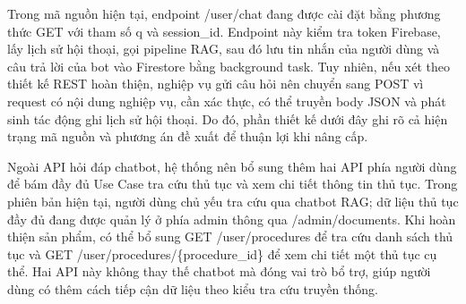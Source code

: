 Trong mã nguồn hiện tại, endpoint /user/chat đang được cài đặt bằng
phương thức GET với tham số q và session\_id. Endpoint này kiểm tra
token Firebase, lấy lịch sử hội thoại, gọi pipeline RAG, sau đó lưu tin
nhắn của người dùng và câu trả lời của bot vào Firestore bằng background
task. Tuy nhiên, nếu xét theo thiết kế REST hoàn thiện, nghiệp vụ gửi
câu hỏi nên chuyển sang POST vì request có nội dung nghiệp vụ, cần xác
thực, có thể truyền body JSON và phát sinh tác động ghi lịch sử hội
thoại. Do đó, phần thiết kế dưới đây ghi rõ cả hiện trạng mã nguồn và
phương án đề xuất để thuận lợi khi nâng cấp.

Ngoài API hỏi đáp chatbot, hệ thống nên bổ sung thêm hai API phía người
dùng để bám đầy đủ Use Case tra cứu thủ tục và xem chi tiết thông tin
thủ tục. Trong phiên bản hiện tại, người dùng chủ yếu tra cứu qua
chatbot RAG; dữ liệu thủ tục đầy đủ đang được quản lý ở phía admin thông
qua /admin/documents. Khi hoàn thiện sản phẩm, có thể bổ sung GET
/user/procedures để tra cứu danh sách thủ tục và GET
/user/procedures/\{procedure\_id\} để xem chi tiết một thủ tục cụ thể.
Hai API này không thay thế chatbot mà đóng vai trò bổ trợ, giúp người
dùng có thêm cách tiếp cận dữ liệu theo kiểu tra cứu truyền thống.

